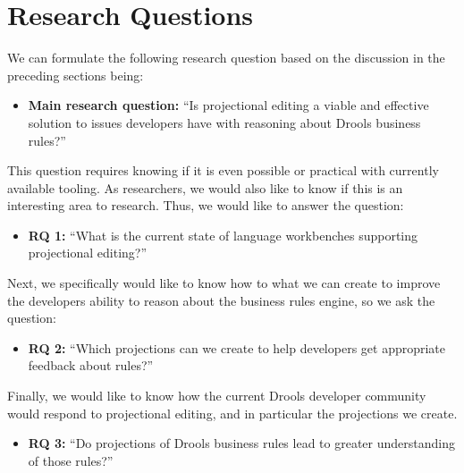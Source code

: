 \section{Research Questions}
\label{section:Research_Questions}

We can formulate the following research question based on the discussion in the preceding sections being:

\begin{itemize}
    \setlength\itemsep{0em}
    \item \textbf{Main research question:} ``Is projectional editing a viable and effective solution to issues developers have with reasoning about Drools business rules?''
\end{itemize}

This question requires knowing if it is even possible or practical with currently available tooling. 
As researchers, we would also like to know if this is an interesting area to research. 
Thus, we would like to answer the question:
\begin{itemize}
    \setlength\itemsep{0em}
    \item \textbf{RQ 1:} ``What is the current state of language workbenches supporting projectional editing?''
\end{itemize}

Next, we specifically would like to know how to what we can create to improve the developers ability to reason about the business rules engine, so we ask the question:
\begin{itemize}
    \setlength\itemsep{0em}
    \item \textbf{RQ 2:} ``Which projections can we create to help developers get appropriate feedback about rules?''
\end{itemize}

Finally, we would like to know how the current Drools developer community would respond to projectional editing, and in particular the projections we create.
\begin{itemize}
    \setlength\itemsep{0em}
    \item  \textbf{RQ 3:} ``Do projections of Drools business rules lead to greater understanding of those rules?''
\end{itemize}